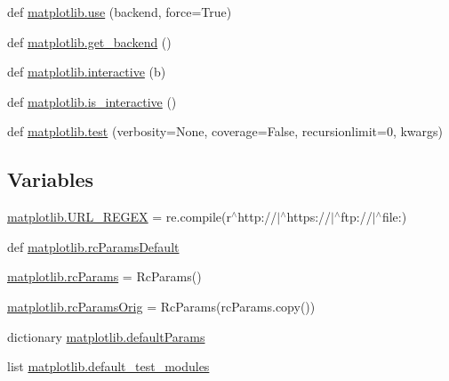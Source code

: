 \begin{DoxyCompactItemize}
def \hyperlink{namespacematplotlib_a1b7516c119dd87a49d3063f1601c8349}{matplotlib.\+use} (backend, force=True)
\item 
def \hyperlink{namespacematplotlib_a4c414ede927e60a4232f5b74394dd30f}{matplotlib.\+get\+\_\+backend} ()
\item 
def \hyperlink{namespacematplotlib_aa54ae7131f356c434ad340da03b7daa2}{matplotlib.\+interactive} (b)
\item 
def \hyperlink{namespacematplotlib_a565795d222b6e75d08b543fc1b5cda27}{matplotlib.\+is\+\_\+interactive} ()
\item 
def \hyperlink{namespacematplotlib_a26dc2f19a2e629436aac80fae8ecee84}{matplotlib.\+test} (verbosity=None, coverage=False, recursionlimit=0, kwargs)
\end{DoxyCompactItemize}
\subsection*{Variables}
\begin{DoxyCompactItemize}
\item 
\hyperlink{namespacematplotlib_ae573a9e7b46ba9090ad27696d75d0f5b}{matplotlib.\+U\+R\+L\+\_\+\+R\+E\+G\+EX} = re.\+compile(r\textquotesingle{}$^\wedge$http\+://$\vert$$^\wedge$https\+://$\vert$$^\wedge$ftp\+://$\vert$$^\wedge$file\+:\textquotesingle{})
\item 
def \hyperlink{namespacematplotlib_a306b794e30fdab5ad5cb2adcc6e3ec43}{matplotlib.\+rc\+Params\+Default}
\item 
\hyperlink{namespacematplotlib_a685c63e0405a4ac508c17ce26dd0f92e}{matplotlib.\+rc\+Params} = Rc\+Params()
\item 
\hyperlink{namespacematplotlib_aea67c86e719473e3b271b493e7e39ef9}{matplotlib.\+rc\+Params\+Orig} = Rc\+Params(rc\+Params.\+copy())
\item 
dictionary \hyperlink{namespacematplotlib_ae61a514c4b7b0c30f9d36eea8cece8a6}{matplotlib.\+default\+Params}
\item 
list \hyperlink{namespacematplotlib_a86a0208b6f53ed86ebee511aa69d45bb}{matplotlib.\+default\+\_\+test\+\_\+modules}
\end{DoxyCompactItemize}
